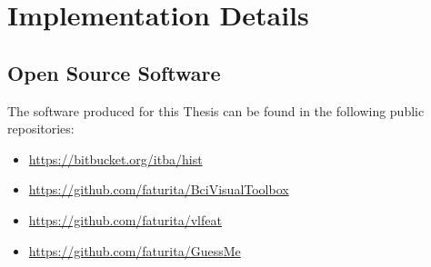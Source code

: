 \chapter{Implementation Details}
\label{chapter:eleven}

%
%
%
%
%
%


%
%
%



\section{Open Source Software}
The software produced for this Thesis can be found in the following public repositories:

\begin{itemize}
\item \url{https://bitbucket.org/itba/hist}
\item \url{https://github.com/faturita/BciVisualToolbox}
\item \url{https://github.com/faturita/vlfeat}
\item \url{https://github.com/faturita/GuessMe}
\end{itemize}

